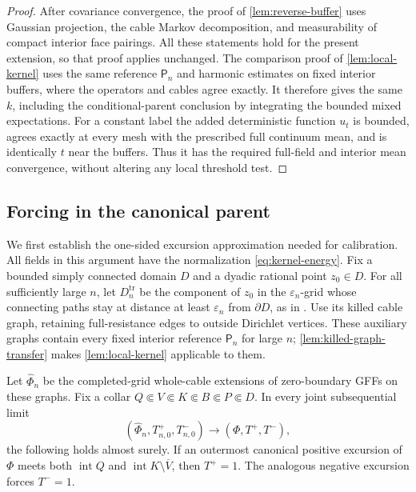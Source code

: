 \begin{proof}
After covariance convergence, the proof of
\cref{lem:reverse-buffer} uses Gaussian projection, the cable Markov
decomposition, and measurability of compact interior face pairings.
All these statements hold for the present extension, so that proof
applies unchanged. The comparison proof of \cref{lem:local-kernel}
uses the same reference \(\mathsf P_n\) and harmonic estimates on
fixed interior buffers, where the operators and cables agree exactly.
It therefore gives the same \(k\), including the conditional-parent
conclusion by integrating the bounded mixed expectations.
For a constant label the added deterministic function \(u_t\) is
bounded, agrees exactly at every mesh with the prescribed full
continuum mean, and is identically \(t\) near the buffers. Thus it
has the required full-field and interior mean convergence, without
altering any local threshold test.
\end{proof}

\subsection{Forcing in the canonical parent}

We first establish the one-sided excursion approximation needed for
calibration.  All fields in this argument have the normalization
\eqref{eq:kernel-energy}.  Fix a bounded simply connected domain \(D\)
and a dyadic rational point \(z_0\in D\).  For all sufficiently large
\(n\), let \(D_n^{\mathrm{tr}}\) be the component of \(z_0\) in the
\(\varepsilon_n\)-grid whose connecting paths stay at distance at least
\(\varepsilon_n\) from \(\partial D\), as in
\cite[(2.6)]{JLQ2023Fields}.  Use its killed cable graph, retaining
full-resistance edges to outside Dirichlet vertices.  These auxiliary
graphs contain every fixed interior reference \(\mathsf P_n\) for
large \(n\); \cref{lem:killed-graph-transfer} makes
\cref{lem:local-kernel} applicable to them.

\begin{lemma}
\label{lem:soup-forcing}
Let \(\widehat\Phi_n\) be the completed-grid whole-cable extensions of
zero-boundary GFFs on these graphs.  Fix a collar
\(Q\Subset V\Subset K\Subset B\Subset P\Subset D\).
In every joint subsequential limit
\[
 (\widehat\Phi_n,T_{n,0}^{+},T_{n,0}^{-})
       \longrightarrow (\Phi,T^+,T^-),
\]
the following holds almost surely.  If an outermost canonical positive
excursion of \(\Phi\) meets both
\(\operatorname{int}Q\) and
\(\operatorname{int}K\setminus\overline V\), then \(T^+=1\).
The analogous negative excursion forces \(T^-=1\).
\end{lemma}

